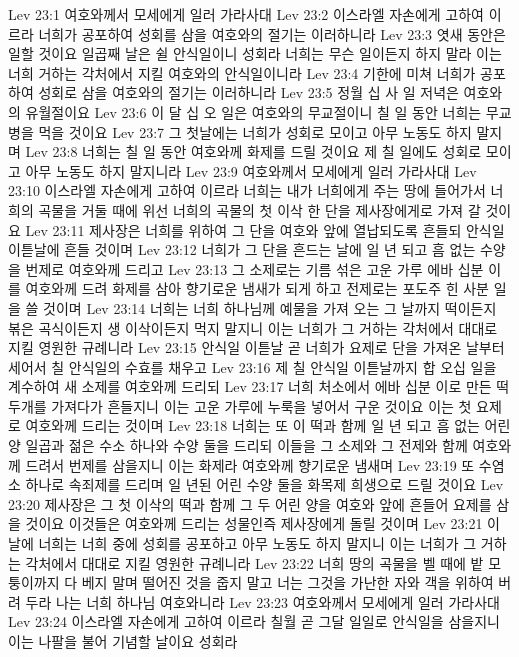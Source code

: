 Lev 23:1  여호와께서 모세에게 일러 가라사대
Lev 23:2  이스라엘 자손에게 고하여 이르라 너희가 공포하여 성회를 삼을 여호와의 절기는 이러하니라
Lev 23:3  엿새 동안은 일할 것이요 일곱째 날은 쉴 안식일이니 성회라 너희는 무슨 일이든지 하지 말라 이는 너희 거하는 각처에서 지킬 여호와의 안식일이니라
Lev 23:4  기한에 미쳐 너희가 공포하여 성회로 삼을 여호와의 절기는 이러하니라
Lev 23:5  정월 십 사 일 저녁은 여호와의 유월절이요
Lev 23:6  이 달 십 오 일은 여호와의 무교절이니 칠 일 동안 너희는 무교병을 먹을 것이요
Lev 23:7  그 첫날에는 너희가 성회로 모이고 아무 노동도 하지 말지며
Lev 23:8  너희는 칠 일 동안 여호와께 화제를 드릴 것이요 제 칠 일에도 성회로 모이고 아무 노동도 하지 말지니라
Lev 23:9  여호와께서 모세에게 일러 가라사대
Lev 23:10  이스라엘 자손에게 고하여 이르라 너희는 내가 너희에게 주는 땅에 들어가서 너희의 곡물을 거둘 때에 위선 너희의 곡물의 첫 이삭 한 단을 제사장에게로 가져 갈 것이요
Lev 23:11  제사장은 너희를 위하여 그 단을 여호와 앞에 열납되도록 흔들되 안식일 이튿날에 흔들 것이며
Lev 23:12  너희가 그 단을 흔드는 날에 일 년 되고 흠 없는 수양을 번제로 여호와께 드리고
Lev 23:13  그 소제로는 기름 섞은 고운 가루 에바 십분 이를 여호와께 드려 화제를 삼아 향기로운 냄새가 되게 하고 전제로는 포도주 힌 사분 일을 쓸 것이며
Lev 23:14  너희는 너희 하나님께 예물을 가져 오는 그 날까지 떡이든지 볶은 곡식이든지 생 이삭이든지 먹지 말지니 이는 너희가 그 거하는 각처에서 대대로 지킬 영원한 규례니라
Lev 23:15  안식일 이튿날 곧 너희가 요제로 단을 가져온 날부터 세어서 칠 안식일의 수효를 채우고
Lev 23:16  제 칠 안식일 이튿날까지 합 오십 일을 계수하여 새 소제를 여호와께 드리되
Lev 23:17  너희 처소에서 에바 십분 이로 만든 떡 두개를 가져다가 흔들지니 이는 고운 가루에 누룩을 넣어서 구운 것이요 이는 첫 요제로 여호와께 드리는 것이며
Lev 23:18  너희는 또 이 떡과 함께 일 년 되고 흠 없는 어린 양 일곱과 젊은 수소 하나와 수양 둘을 드리되 이들을 그 소제와 그 전제와 함께 여호와께 드려서 번제를 삼을지니 이는 화제라 여호와께 향기로운 냄새며
Lev 23:19  또 수염소 하나로 속죄제를 드리며 일 년된 어린 수양 둘을 화목제 희생으로 드릴 것이요
Lev 23:20  제사장은 그 첫 이삭의 떡과 함께 그 두 어린 양을 여호와 앞에 흔들어 요제를 삼을 것이요 이것들은 여호와께 드리는 성물인즉 제사장에게 돌릴 것이며
Lev 23:21  이 날에 너희는 너희 중에 성회를 공포하고 아무 노동도 하지 말지니 이는 너희가 그 거하는 각처에서 대대로 지킬 영원한 규례니라
Lev 23:22  너희 땅의 곡물을 벨 때에 밭 모퉁이까지 다 베지 말며 떨어진 것을 줍지 말고 너는 그것을 가난한 자와 객을 위하여 버려 두라 나는 너희 하나님 여호와니라
Lev 23:23  여호와께서 모세에게 일러 가라사대
Lev 23:24  이스라엘 자손에게 고하여 이르라 칠월 곧 그달 일일로 안식일을 삼을지니 이는 나팔을 불어 기념할 날이요 성회라
